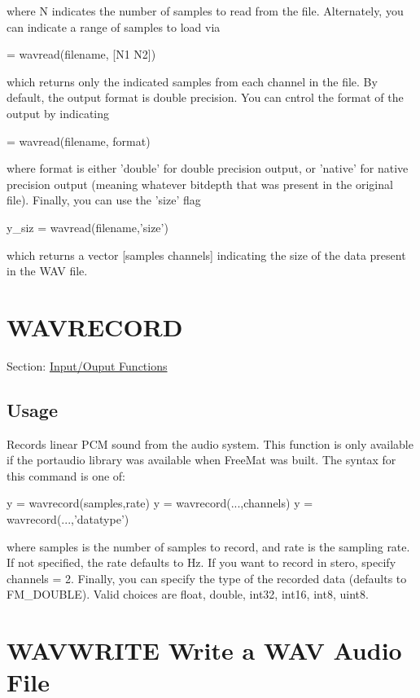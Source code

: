  where {\ttfamily N} indicates the number of samples to read from the file. Alternately, you can indicate a range of samples to load via \begin{DoxyVerb}  [...] = wavread(filename, [N1 N2])
\end{DoxyVerb}
 which returns only the indicated samples from each channel in the file. By default, the output format is {\ttfamily double} precision. You can cntrol the format of the output by indicating \begin{DoxyVerb}  [...] = wavread(filename, format)
\end{DoxyVerb}
 where {\ttfamily format} is either {\ttfamily 'double'} for double precision output, or {\ttfamily 'native'} for native precision output (meaning whatever bitdepth that was present in the original file). Finally, you can use the {\ttfamily 'size'} flag \begin{DoxyVerb}  y_siz = wavread(filename,'size')
\end{DoxyVerb}
 which returns a vector {\ttfamily \mbox{[}samples channels\mbox{]}} indicating the size of the data present in the W\-A\-V file. \hypertarget{io_wavrecord}{}\section{W\-A\-V\-R\-E\-C\-O\-R\-D}\label{io_wavrecord}
Section\-: \hyperlink{sec_io}{Input/\-Ouput Functions} \hypertarget{vtkwidgets_vtkxyplotwidget_Usage}{}\subsection{Usage}\label{vtkwidgets_vtkxyplotwidget_Usage}
Records linear P\-C\-M sound from the audio system. This function is only available if the {\ttfamily portaudio} library was available when Free\-Mat was built. The syntax for this command is one of\-: \begin{DoxyVerb}  y = wavrecord(samples,rate)
  y = wavrecord(...,channels)
  y = wavrecord(...,'datatype')
\end{DoxyVerb}
 where {\ttfamily samples} is the number of samples to record, and {\ttfamily rate} is the sampling rate. If not specified, the {\ttfamily rate} defaults to {\-Hz}. If you want to record in stero, specify {\ttfamily channels = 2}. Finally, you can specify the type of the recorded data (defaults to {\ttfamily F\-M\-\_\-\-D\-O\-U\-B\-L\-E}). Valid choices are {\ttfamily float, double, int32, int16, int8, uint8}. \hypertarget{io_wavwrite}{}\section{W\-A\-V\-W\-R\-I\-T\-E Write a W\-A\-V Audio File}\label{io_wavwrite}
